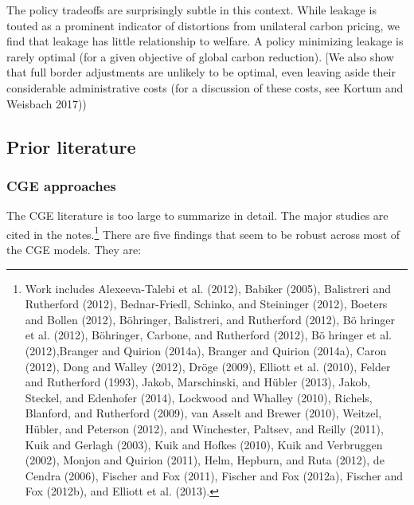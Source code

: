 \documentclass[notitlepage,12pt]{article}
\begin{document}
The policy tradeoffs are surprisingly subtle in this context. While leakage
is touted as a prominent indicator of distortions from unilateral carbon
pricing, we find that leakage has little relationship to welfare. A policy
minimizing leakage is rarely optimal (for a given objective of global carbon
reduction). [We also show that full border adjustments are unlikely to be
optimal, even leaving aside their considerable administrative costs (for a
discussion of these costs, see Kortum and Weisbach 2017))

\subsection{Prior literature}

\subsubsection{CGE approaches}

The CGE literature is too large to summarize in detail. The major studies
are cited in the notes.\footnote{%
Work includes Alexeeva-Talebi et al. (2012), Babiker (2005), Balistreri and
Rutherford (2012), Bednar-Friedl, Schinko, and Steininger (2012), Boeters
and Bollen (2012), B\"{o}hringer, Balistreri, and Rutherford (2012), B\"{o}%
hringer et al. (2012), B\"{o}hringer, Carbone, and Rutherford (2012), B\"{o}%
hringer et al. (2012),Branger and Quirion (2014a), Branger and Quirion
(2014a), Caron (2012), Dong and Walley (2012), Dr\"{o}ge (2009), Elliott et
al. (2010), Felder and Rutherford (1993), Jakob, Marschinski, and H\"{u}bler
(2013), Jakob, Steckel, and Edenhofer (2014), Lockwood and Whalley (2010),
Richels, Blanford, and Rutherford (2009), van Asselt and Brewer (2010),
Weitzel, H\"{u}bler, and Peterson (2012), and Winchester, Paltsev, and
Reilly (2011), Kuik and Gerlagh (2003), Kuik and Hofkes (2010), Kuik and
Verbruggen (2002), Monjon and Quirion (2011), Helm, Hepburn, and Ruta
(2012), de Cendra (2006), Fischer and Fox (2011), Fischer and Fox (2012a),
Fischer and Fox (2012b), and Elliott et al. (2013).} There are five findings
that seem to be robust across most of the CGE models. They are:
\end{document}
